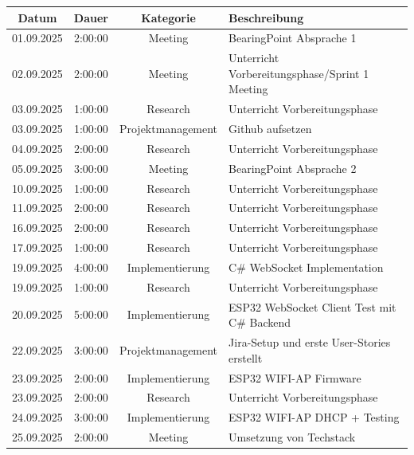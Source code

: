 \documentclass{article}
\begin{document}
\begin{table}[H]
  \centering
  \begin{tabularx}{\textwidth}{|c|c|c|X|}
    \hline
    \rowcolor{black!10}\textbf{Datum} & \textbf{Dauer} & \textbf{Kategorie} & \textbf{Beschreibung} \\
    \hline
    01.09.2025 & 2:00:00 & Meeting           & BearingPoint Absprache 1 \\ \hline
    02.09.2025 & 2:00:00 & Meeting           & Unterricht Vorbereitungsphase/Sprint 1 Meeting \\ \hline
    03.09.2025 & 1:00:00 & Research          & Unterricht Vorbereitungsphase \\ \hline
    03.09.2025 & 1:00:00 & Projektmanagement & Github aufsetzen \\ \hline
    04.09.2025 & 2:00:00 & Research          & Unterricht Vorbereitungsphase \\ \hline
    05.09.2025 & 3:00:00 & Meeting           & BearingPoint Absprache 2 \\ \hline
    10.09.2025 & 1:00:00 & Research          & Unterricht Vorbereitungsphase \\ \hline
    11.09.2025 & 2:00:00 & Research          & Unterricht Vorbereitungsphase \\ \hline
    16.09.2025 & 2:00:00 & Research          & Unterricht Vorbereitungsphase \\ \hline
    17.09.2025 & 1:00:00 & Research          & Unterricht Vorbereitungsphase \\ \hline
    19.09.2025 & 4:00:00 & Implementierung   & C\# WebSocket Implementation \\ \hline
    19.09.2025 & 1:00:00 & Research          & Unterricht Vorbereitungsphase \\ \hline
    20.09.2025 & 5:00:00 & Implementierung   & ESP32 WebSocket Client Test mit C\# Backend \\ \hline
    22.09.2025 & 3:00:00 & Projektmanagement & Jira-Setup und erste User-Stories erstellt \\ \hline
    23.09.2025 & 2:00:00 & Implementierung   & ESP32 WIFI-AP Firmware \\ \hline
    23.09.2025 & 2:00:00 & Research          & Unterricht Vorbereitungsphase \\ \hline
    24.09.2025 & 3:00:00 & Implementierung   & ESP32 WIFI-AP DHCP + Testing \\ \hline
    25.09.2025 & 2:00:00 & Meeting           & Umsetzung von Techstack \\ \hline

\end{tabularx}
\end{table}
\end{document}
